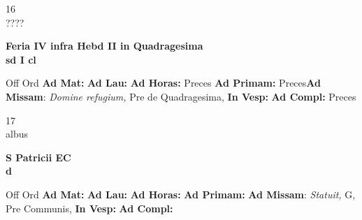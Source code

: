 \documentclass[10pt, openany]{book}
\begin{document}
    \begin{center}
        \begin{minipage}{3.5in}
            \vspace{2em}
            \begin{minipage}{0.5in}
                {\Huge 16} \\
                {\normalsize ????}
            \end{minipage}
            \begin{minipage}{3.0in}
                \textbf{ \large Feria IV infra Hebd II in Quadragesima \\
                \textnormal{\normalsize sd I cl}}

            \end{minipage}
            \begin{justify}Off Ord
                \textbf{Ad Mat: }
                \textbf{Ad Lau: }
                \textbf{Ad Horas: }Preces
                \textbf{Ad Primam: }Preces\textbf{Ad Missam}: \textit{Domine refugium,} Pre de Quadragesima, 
                \textbf{In Vesp: }
                \textbf{Ad Compl: }Preces
            \end{justify}
        \end{minipage}
    \end{center}

    \begin{center}
        \begin{minipage}{3.5in}
            \vspace{2em}
            \begin{minipage}{0.5in}
                {\Huge 17} \\
                {\normalsize albus}
            \end{minipage}
            \begin{minipage}{3.0in}
                \textbf{ \large S Patricii EC \\
                \textnormal{\normalsize d}}

            \end{minipage}
            \begin{justify}Off Ord
                \textbf{Ad Mat: }
                \textbf{Ad Lau: }
                \textbf{Ad Horas: }
                \textbf{Ad Primam: }\textbf{Ad Missam}: \textit{Statuit,} G, Pre Communis, 
                \textbf{In Vesp: }
                \textbf{Ad Compl: }
            \end{justify}
        \end{minipage}
    \end{center}
\end{document}
